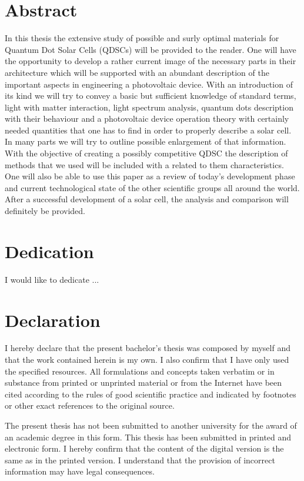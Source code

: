 \documentclass[12pt,twoside]{report}
\numberwithin{equation}{subsection}
\begin{document}
\graphicspath{ {images/} }


\chapter*{Abstract}
In this thesis the extensive study of possible and surly optimal materials for Quantum Dot Solar Cells (QDSCs) will be provided to the reader. One will have the opportunity to develop a rather current image of the necessary parts in their architecture which will be supported with an abundant description of the important aspects in engineering a photovoltaic device. With an introduction of its kind we will try to convey a basic but sufficient knowledge of standard terms, light with matter interaction, light spectrum analysis, quantum dots description with their behaviour and a photovoltaic device operation theory with certainly needed quantities that one has to find in order to properly describe a solar cell. In many parts we will try to outline possible enlargement of that information. With the objective of creating a possibly competitive QDSC the description of methods that we used will be included with a related to them characteristics. One will also be able to use this paper as a review of today's development phase and current technological state of the other scientific groups all around the world.  After a successful development of a solar cell, the analysis and comparison will definitely be provided.
 
\chapter*{Dedication}
I would like to dedicate ...

\chapter*{Declaration}


I hereby declare that the present bachelor's thesis was composed
by myself and that the work contained herein is my own. I also confirm that I have only used the
specified resources. All formulations and concepts taken verbatim or in substance from printed
or unprinted material or from the Internet have been cited according to the rules of good
scientific practice and indicated by footnotes or other exact references to the original source.

\vline

\noindent The present thesis has not been submitted to another university for the award of an academic
degree in this form. This thesis has been submitted in printed and electronic form. I hereby
confirm that the content of the digital version is the same as in the printed version.
I understand that the provision of incorrect information may have legal consequences.
\vfill
\end{document}
